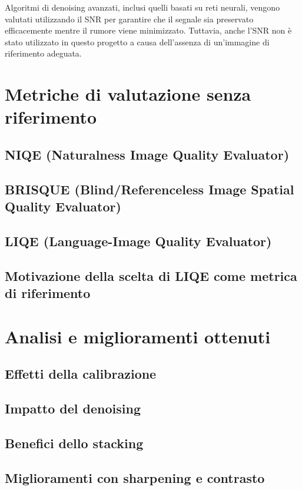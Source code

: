 Algoritmi di denoising avanzati, inclusi quelli basati su reti neurali, vengono valutati utilizzando il SNR per garantire che il segnale sia preservato efficacemente mentre il rumore viene minimizzato. Tuttavia, anche l'SNR non è stato utilizzato in questo progetto a causa dell'assenza di un'immagine di riferimento adeguata.

\section{Metriche di valutazione senza riferimento} \label{sec:nr_metrics}

\subsection{NIQE (Naturalness Image Quality Evaluator)} \label{subsec:niqe}

\subsection{BRISQUE (Blind/Referenceless Image Spatial Quality Evaluator)} \label{subsec:brisque}

\subsection{LIQE (Language-Image Quality Evaluator)} \label{subsec:liqe}

\subsection{Motivazione della scelta di LIQE come metrica di riferimento} \label{subsec:why_liqe}

\section{Analisi e miglioramenti ottenuti} \label{sec:analysis}

\subsection{Effetti della calibrazione} \label{subsec:analysis_cal}

\subsection{Impatto del denoising} \label{subsec:analysis_den}

\subsection{Benefici dello stacking} \label{subsec:analysis_stack}

\subsection{Miglioramenti con sharpening e contrasto} \label{subsec:analisys_post}

\cleardoublepage